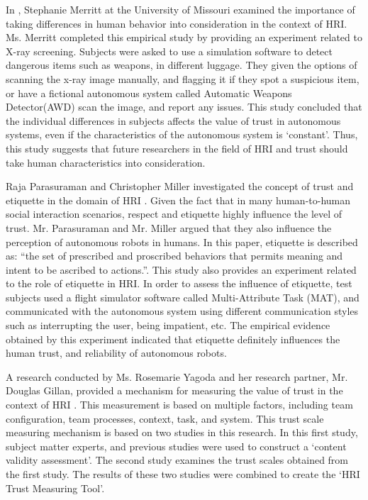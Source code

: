 \documentclass[runningheads,a4paper]{llncs}
\begin{document}
In \cite{merritt2008not}, Stephanie Merritt at the University of Missouri examined the importance of taking differences in human behavior into consideration in the context of HRI. Ms. Merritt completed this empirical study by providing an experiment related to  X-ray screening. Subjects were asked to use a simulation software to detect dangerous items such as weapons, in different luggage. They given the options of scanning the x-ray image manually, and flagging it if they spot a suspicious item, or have a fictional autonomous system called  Automatic Weapons Detector(AWD) scan the image, and report any issues. This study concluded that the individual differences in subjects affects the value of trust in autonomous systems, even if the characteristics of the autonomous system is `constant'. Thus, this study suggests that future researchers in the field of HRI and trust should take human characteristics into consideration.

Raja Parasuraman and Christopher Miller investigated the concept of trust and etiquette in the domain of HRI \cite{parasuraman2004trust}. Given the fact that in many human-to-human social interaction scenarios, respect and etiquette highly influence the level of trust. Mr. Parasuraman and Mr. Miller argued that they also influence the perception of autonomous robots in humans. In this paper, etiquette is described as: ``the set of prescribed and proscribed behaviors
that permits meaning and intent to be ascribed to
actions.''. This study also provides an experiment related to the role of etiquette in HRI. In order to assess the influence of etiquette, test subjects used a flight simulator software called Multi-Attribute Task (MAT), and communicated with the autonomous system using different communication styles such as interrupting the user, being impatient, etc. The empirical evidence obtained by this experiment indicated that etiquette definitely influences the human trust, and reliability of autonomous robots.

A research conducted by Ms. Rosemarie Yagoda and her research partner, Mr. Douglas Gillan, provided a mechanism for measuring the value of trust in the context of HRI \cite{yagoda2012you}. This measurement is based on multiple factors, including team configuration, team processes, context, task, and system. This trust scale measuring mechanism is based on two studies in this research. In this first study, subject matter experts, and previous studies were used to construct a `content validity assessment'. The second study examines the trust scales obtained from the first study. The results of these two studies were combined to create the `HRI Trust Measuring Tool'.
\end{document}
